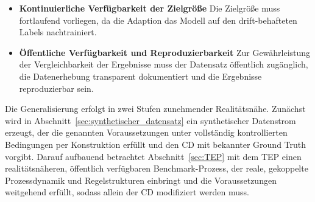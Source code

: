 \begin{itemize}
    \item \textbf{Kontinuierliche Verfügbarkeit der Zielgröße} \newline
    Die Zielgröße muss fortlaufend vorliegen, da die Adaption das Modell auf den drift-behafteten Labels nachtrainiert.

    \item \textbf{Öffentliche Verfügbarkeit und Reproduzierbarkeit} \newline 
    Zur Gewährleistung der Vergleichbarkeit der Ergebnisse muss der Datensatz öffentlich zugänglich, die Datenerhebung transparent dokumentiert und die Ergebnisse reproduzierbar sein.
\end{itemize}
%
Die Generalisierung erfolgt in zwei Stufen zunehmender Realitätsnähe. Zunächst wird in Abschnitt~\ref{sec:synthetischer_datensatz} ein synthetischer Datenstrom erzeugt, der die genannten Voraussetzungen unter vollständig kontrollierten Bedingungen per Konstruktion erfüllt und den \ac{CD} mit bekannter Ground Truth vorgibt. Darauf aufbauend betrachtet Abschnitt~\ref{sec:TEP} mit dem \ac{TEP} einen realitätsnäheren, öffentlich verfügbaren Benchmark-Prozess, der reale, gekoppelte Prozessdynamik und Regelstrukturen einbringt und die Voraussetzungen weitgehend erfüllt, sodass allein der \ac{CD} modifiziert werden muss.
%
